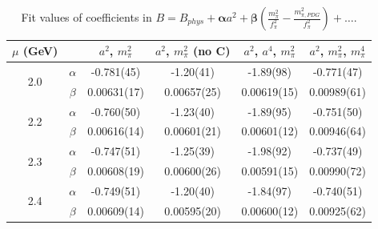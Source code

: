 \documentclass[12pt]{extarticle}
\begin{document}
\begin{table}[h!]
\begin{center}
\begin{tabular}{|c c|c|c|c|c|}
\hline
$\mu$ (GeV) &  & $a^2$, $m_\pi^2$& $a^2$, $m_\pi^2$ (no C)& $a^2$, $a^4$, $m_\pi^2$& $a^2$, $m_\pi^2$, $m_\pi^4$\\
\hline
\multirow{2}{0.5in}{2.0} & $\alpha$ & -0.781(45)& -1.20(41)& -1.89(98)& -0.771(47)\\
 & $\beta$ & 0.00631(17)& 0.00657(25)& 0.00619(15)& 0.00989(61)\\
\hline
\multirow{2}{0.5in}{2.2} & $\alpha$ & -0.760(50)& -1.23(40)& -1.89(95)& -0.751(50)\\
 & $\beta$ & 0.00616(14)& 0.00601(21)& 0.00601(12)& 0.00946(64)\\
\hline
\multirow{2}{0.5in}{2.3} & $\alpha$ & -0.747(51)& -1.25(39)& -1.98(92)& -0.737(49)\\
 & $\beta$ & 0.00608(19)& 0.00600(26)& 0.00591(15)& 0.00990(72)\\
\hline
\multirow{2}{0.5in}{2.4} & $\alpha$ & -0.749(51)& -1.20(40)& -1.84(97)& -0.740(51)\\
 & $\beta$ & 0.00609(14)& 0.00595(20)& 0.00600(12)& 0.00925(62)\\
\hline
\end{tabular}
\caption{Fit values of coefficients in $B = B_{phys} + \mathbf{\alpha} a^2 + \mathbf{\beta}\left(\frac{m_\pi^2}{f_\pi^2}-\frac{m_{\pi,PDG}^2}{f_\pi^2}\right) + \ldots$.}
\end{center}
\end{table}
















\clearpage
\end{document}
